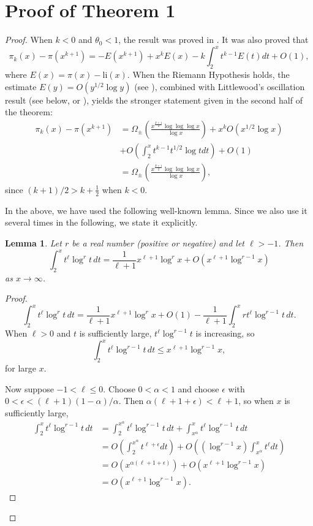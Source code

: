 \documentclass[12pt]{amsart}
\newtheorem{lemma}{Lemma}
\begin{document}
\section{Proof of Theorem 1}
\begin{proof}
When $k<0$ and $\theta_0<1$, the result was proved in \cite[p. 174]{GW}.
It was also proved that
$$
\pi_k(x)- \pi(x^{k+1}) = -E(x^{k+1})+x^kE(x) - k\int_2^x t^{k-1}E(t) dt  + O(1),
$$
where $E(x) = \pi(x) - \text{li}(x)$.  When the Riemann Hypothesis holds, the estimate $E(y)= O(y^{1/2}\log y)$  (see \cite[Theorem 13.1]{MV}), combined with Littlewood's oscillation result (see below, or \cite[p. 479]{MV}),
yields the stronger statement given in the second half of the theorem:
\begin{align*}
\pi_k(x)- \pi(x^{k+1}) &=\Omega_{\pm}\left(\frac{x^{\frac{k+1}{2}}\log\log\log x}{\log x}\right) +x^kO\left(x^{1/2}\log x\right) \\
&+O\left(\int_2^x t^{k-1}t^{1/2}\log t dt\right)  + O(1)\\
&= \Omega_{\pm}\left(\frac{x^{\frac{k+1}{2}}\log\log\log x}{\log x}\right),
\end{align*}
since $(k+1)/2 > k+\frac12$ when $k<0$.

In the above, we have used the following well-known lemma. Since we also use it several times in the following, we state it explicitly.

\begin{lemma} Let $r$ be a real number (positive or negative) and let $\ell>-1$. Then
$$
\int_2^x t^{\ell}\log^r t\,  dt = \frac{1}{\ell+1}x^{\ell+1}\log^r x + O\left(x^{\ell+1}\log^{r-1} x\right)
$$
as $x\to\infty$.
\end{lemma}
\begin{proof}
$$
\int_2^x t^{\ell}\log^r t \, dt = \frac{1}{\ell+1}x^{\ell+1}\log^r x + O(1)  - \frac{1}{\ell+1}\int_2^x r t^{\ell}\log^{r-1}t\,  dt.
$$
 When $\ell > 0$ and $t$ is sufficiently large, $t^{\ell}\log^{r-1} t$ is increasing, so 
$$
\int_2^x  t^{\ell}\log^{r-1} t\, dt \le x^{\ell+1}\log^{r-1} x,
$$
for large $x$.

Now suppose $-1<\ell\le 0$. Choose $0<\alpha<1$ and choose $\epsilon$ with $0<\epsilon < (\ell+1)(1-\alpha)/\alpha$. Then $\alpha(\ell+1+\epsilon) <\ell+1$, so
when $x$ is sufficiently large, 
\begin{align*}
\int_2^x  t^{\ell}\log^{r-1} t\, dt &= \int_2^{x^{\alpha}} t^{\ell}\log^{r-1} t\, dt+\int_{x^{\alpha}}^x t^{\ell}\log^{r-1}t\, dt\\
&= O\left( \int_2^{x^{\alpha}} t^{\ell+\epsilon} dt\right) +O\left((\log^{r-1} x)\int_{x^{\alpha}}^x t^{\ell} dt\right)\\
& = O\left(x^{\alpha(\ell+1+\epsilon)}\right) +  O\left(x^{\ell+1}\log^{r-1} x\right)\\
&=   O\left(x^{\ell+1}\log^{r-1} x\right).
\end{align*}
\end{proof}



\end{proof}
\end{document}

